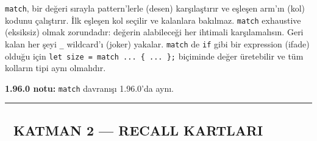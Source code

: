 \documentclass[12pt,a4paper]{article}
\begin{document}
\texttt{match}, bir değeri sırayla pattern'lerle (desen) karşılaştırır ve eşleşen arm'ın (kol) kodunu çalıştırır. İlk eşleşen kol seçilir ve kalanlara bakılmaz. \texttt{match} exhaustive (eksiksiz) olmak zorundadır: değerin alabileceği her ihtimali karşılamalısın. Geri kalan her şeyi \texttt{\_} wildcard'ı (joker) yakalar. \texttt{match} de \texttt{if} gibi bir expression (ifade) olduğu için \texttt{let\ size\ =\ match\ ...\ \{\ ...\ \};} biçiminde değer üretebilir ve tüm kolların tipi aynı olmalıdır.

\textbf{1.96.0 notu:} \texttt{match} davranışı 1.96.0'da aynı.

\begin{center}\rule{0.5\linewidth}{0.5pt}\end{center}

\subsection{🔵 KATMAN 2 --- RECALL KARTLARI}\label{katman-2-—-recall-kartlari-7}
\end{document}
